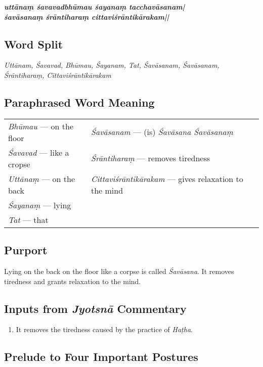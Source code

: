 \begin{shloka}
\textit{\textbf{uttānaṃ śavavadbhūmau śayanaṃ tacchavāsanam|}\\
\textbf{śavāsanaṃ śrāntiharaṃ cittaviśrāntikārakam||}}
\end{shloka}

\subsection*{Word Split}

\textit{Uttānam, Śavavad, Bhūmau, Śayanam, Tat, Śavāsanam, Śavāsanam, Śrāntiharaṃ, Cittaviśrāntikārakam}

\subsection*{Paraphrased Word Meaning}

\begin{longtable}{>{\noindent\raggedright}p{5cm}>{\noindent\raggedright}p{5cm}}
\textit{Bhūmau} --- on the floor  & \textit{Śavāsanam} --- (is) \textit{Śavāsana Śavāsanaṃ}\tabularnewline
\textit{Śavavad}  --- like a cropse  & \textit{Śrāntiharaṃ} --- removes tiredness\tabularnewline
\textit{Uttānaṃ} --- on the back  & \textit{Cittaviśrāntikārakam} --- gives relaxation to the mind\tabularnewline
\textit{Śayanaṃ} --- lying  & \tabularnewline
\textit{Tat} --- that  & 
\end{longtable}

\subsection*{Purport}

Lying on the back on the floor like a corpse is called \textit{Śavāsana}. It removes tiredness and grants relaxation to the mind. 

\subsection*{Inputs from \textit{Jyotsnā} Commentary}

\begin{enumerate}
\item It removes the tiredness caused by the practice of \textit{Haṭha}. 
\end{enumerate}

\subsection*{Prelude to Four Important Postures}

